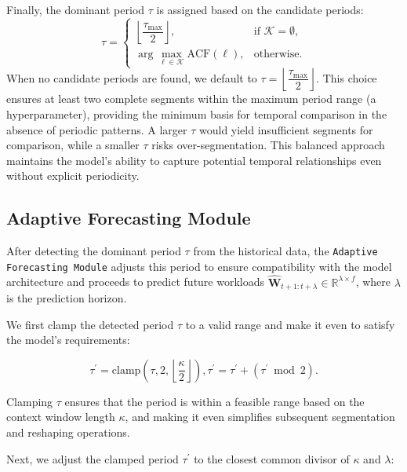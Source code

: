 \documentclass{ieeetmlcn}
\begin{document}
Finally, the dominant period $\tau$ is assigned based on the candidate periods:
\begin{equation}
\label{eq:period_assignment}
\tau = \begin{cases}
    \left\lfloor \dfrac{\tau_{\max}}{2} \right\rfloor, & \text{if } \mathcal{K} = \emptyset, \\[2ex]
    \displaystyle\arg\max_{\ell \in \mathcal{K}} \text{ACF}(\ell), & \text{otherwise}.
\end{cases}
\end{equation}
{\color{blue}
When no candidate periods are found, we default to $\tau = \left\lfloor \dfrac{\tau_{\max}}{2} \right\rfloor$. This choice ensures at least two complete segments within the maximum period range (a hyperparameter), providing the minimum basis for temporal comparison in the absence of periodic patterns. A larger $\tau$ would yield insufficient segments for comparison, while a smaller $\tau$ risks over-segmentation. This balanced approach maintains the model's ability to capture potential temporal relationships even without explicit periodicity.}

\subsection{Adaptive Forecasting Module}
\label{sec:adaptive_forecasting}

After detecting the dominant period $\tau$ from the historical data, the \texttt{Adaptive Forecasting Module} adjusts this period to ensure compatibility with the model architecture and proceeds to predict future workloads $\hat{\mathbf{W}}_{t+1:t+\lambda} \in \mathbb{R}^{\lambda \times f}$, where $\lambda$ is the prediction horizon.

We first clamp the detected period $\tau$ to a valid range and make it even to satisfy the model's requirements:

\begin{equation}
\label{eq:tau_clamp}
\tau^\prime = \text{clamp}\left( \tau,  2,  \left\lfloor \dfrac{\kappa}{2} \right\rfloor \right),   \tau^\prime = \tau^\prime + (\tau^\prime \bmod 2).
\end{equation}

Clamping $\tau$ ensures that the period is within a feasible range based on the context window length $\kappa$, and making it even simplifies subsequent segmentation and reshaping operations.

Next, we adjust the clamped period $\tau^\prime$ to the closest common divisor of $\kappa$ and $\lambda$:
\end{document}
